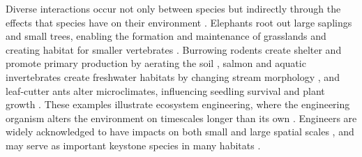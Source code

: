 \documentclass[twocolumn,preprintnumbers,amsmath,amssymb,superscriptaddress,linenumbers]{revtex4-1}
\begin{document}



Diverse interactions occur not only between species but indirectly through the effects that species have on their environment \cite{Jones1994,Olff2009,OdlingSmee2013}.
Elephants root out large saplings and small trees, enabling the formation and maintenance of grasslands \cite{Haynes2012} and creating habitat for smaller vertebrates \cite{Pringle2008}.
Burrowing rodents create shelter and promote primary production by aerating the soil \cite{Reichman2002}, salmon and aquatic invertebrates create freshwater habitats by changing stream morphology \cite{Moore2006}, and leaf-cutter ants alter microclimates, influencing seedling survival and plant growth \cite{Meyer2011}.
These examples illustrate ecosystem engineering, where the engineering organism alters the environment on timescales longer than its own \cite{Hastings2007}.
Engineers are widely acknowledged to have impacts on both small and large spatial scales \cite{Wright2006b}, and may serve as important keystone species in many habitats \cite{Jones2012}.
\end{document}
